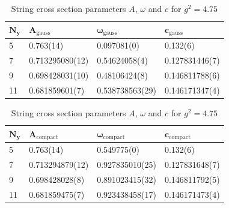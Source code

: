 \begin{table}[!hb]
\centering
\begin{tabular}{llll}
    $\mathbf{N_y}$ & $\mathbf{A_\mathrm{gauss}}$ & $\mathbf{\omega_\mathrm{gauss}}$ & $\mathbf{c_\mathrm{gauss}}$ \\ \hline
   5 & 0.763(14) & 0.097081(0) & 0.132(6) \\
   7 & 0.713295080(12) & 0.54624058(4) & 0.127831446(7) \\
   9 & 0.698428031(10) & 0.48106424(8) & 0.146811788(6) \\
   11 & 0.681859601(7) & 0.538738563(29) & 0.146171347(4) \\
\end{tabular}
\begin{tabular}{llll}
    $\mathbf{N_y}$ & $\mathbf{A_\mathrm{compact}}$ & $\mathbf{\omega_\mathrm{compact}}$ & $\mathbf{c_\mathrm{compact}}$ \\ \hline
   5 & 0.763(14) & 0.549775(0) & 0.132(6) \\
   7 & 0.713294879(12) & 0.927835010(25) & 0.127831648(7) \\
   9 & 0.698428028(8) & 0.891023415(32) & 0.146811792(5) \\
   11 & 0.681859475(7) & 0.923438458(17) & 0.146171473(4) \\
\end{tabular}
\caption{String cross section parameters $A$, $\omega$ and $c$ for $g^2=4.75$}
\end{table}
